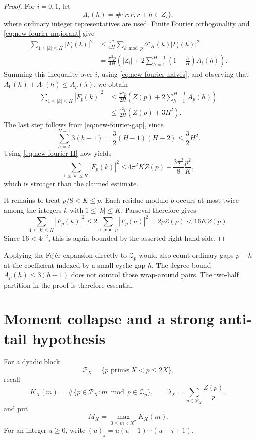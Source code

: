 \begin{proof}
For \(i=0,1\), let
\[
 A_i(h)=\#\{r:r,r+h\in Z_i\},
\]
where ordinary integer representatives are used.  Finite Fourier
orthogonality and \eqref{eq:new-fourier-majorant} give
\begin{align*}
 \sum_{1\le|k|\le K}|F_i(k)|^2
 &\le\frac{\pi^2}{4H}
   \sum_{k\bmod p}\mathcal F_H(k)|F_i(k)|^2\\
 &=\frac{\pi^2p}{4H}
   \left(
     |Z_i|+
     2\sum_{h=1}^{H-1}
       \left(1-\frac hH\right)A_i(h)
   \right).
\end{align*}
Summing this inequality over \(i\), using
\eqref{eq:new-fourier-halves}, and observing that
\(A_0(h)+A_1(h)\le A_p(h)\), we obtain
\begin{align*}
 \sum_{1\le|k|\le K}|F_p(k)|^2
 &\le\frac{\pi^2p}{2H}
   \left(Z(p)+2\sum_{h=1}^{H-1}A_p(h)\right)\\
 &\le\frac{\pi^2p}{2H}\left(Z(p)+3H^2\right).
\end{align*}
The last step follows from \eqref{eq:new-fourier-gap}, since
\[
 \sum_{h=2}^{H-1}3(h-1)
 =\frac32(H-1)(H-2)\le\frac32H^2.
\]
Using \eqref{eq:new-fourier-H} now yields
\[
 \sum_{1\le|k|\le K}|F_p(k)|^2
 \le
 4\pi^2KZ(p)+\frac{3\pi^2}{8}\frac{p^2}{K},
\]
which is stronger than the claimed estimate.

It remains to treat \(p/8<K\le p\).  Each residue modulo \(p\)
occurs at most twice among the integers \(k\) with
\(1\le|k|\le K\).  Parseval therefore gives
\[
 \sum_{1\le|k|\le K}|F_p(k)|^2
 \le2\sum_{a\bmod p}|F_p(a)|^2
 =2pZ(p)
 <16KZ(p).
\]
Since \(16<4\pi^2\), this is again bounded by the asserted
right-hand side.
\end{proof}

\begin{remark}
Applying the Fej\'er expansion directly to \(\mathcal Z_p\) would
also count ordinary gaps \(p-h\) at the coefficient indexed by a
small cyclic gap \(h\).  The degree bound
\(A_p(h)\le3(h-1)\) does not control those wrap-around pairs.
The two-half partition in the proof is therefore essential.
\end{remark}


\section{Moment collapse and a strong anti-tail hypothesis}
\label{sec:moment-collapse}

For a dyadic block
\[
 \mathcal P_X=\{p\text{ prime}:X<p\le2X\},
\]
recall
\[
 K_X(m)
 =\#\{p\in\mathcal P_X:m\bmod p\in\mathcal Z_p\},
 \qquad
 \lambda_X=\sum_{p\in\mathcal P_X}\frac{Z(p)}p,
\]
and put
\[
 M_X=\max_{0\le m<X^2}K_X(m).
\]
For an integer \(u\ge0\), write
\((u)_j=u(u-1)\cdots(u-j+1)\).

